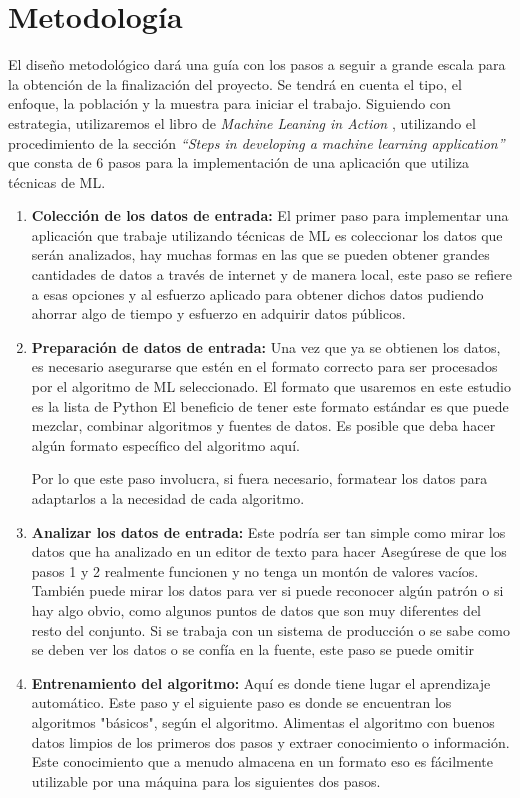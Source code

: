 \section{Metodología}
El diseño metodológico dará una guía con los pasos a seguir a grande escala para la obtención de la finalización del proyecto. Se tendrá en cuenta el tipo, el enfoque, la población y la muestra para iniciar el trabajo. Siguiendo con estrategia, utilizaremos el libro de \emph{Machine Leaning in Action} \cite{Harrington2012}, utilizando el procedimiento de la sección \emph{“Steps in developing a machine learning application”} que consta de 6 pasos para la implementación de una aplicación que utiliza técnicas de ML. 
\begin{enumerate}
	\item \textbf{Colección de los datos de entrada:} El primer paso para implementar una aplicación que trabaje utilizando técnicas de ML es coleccionar los datos que serán analizados, hay muchas formas en las que se pueden obtener grandes cantidades de datos a través de internet y de manera local, este paso se refiere a esas opciones y al esfuerzo aplicado para obtener dichos datos pudiendo ahorrar algo de tiempo y esfuerzo en adquirir datos públicos. 
	\item \textbf{Preparación de datos de entrada:} Una vez que ya se obtienen los datos, es necesario asegurarse que estén en el formato correcto para ser procesados por el algoritmo de ML seleccionado. El formato que usaremos en este estudio es la lista de Python El beneficio de tener este formato estándar es que puede mezclar, combinar algoritmos y fuentes de datos. Es posible que deba hacer algún formato específico del algoritmo aquí.
\par Por lo que este paso involucra, si fuera necesario, formatear los datos para adaptarlos a la necesidad de cada algoritmo.

	\item \textbf{Analizar los datos de entrada:} Este podría ser tan simple como mirar los datos que ha analizado en un editor de texto para hacer Asegúrese de que los pasos 1 y 2 realmente funcionen y no tenga un montón de valores vacíos. También puede mirar los datos para ver si puede reconocer algún patrón o si hay algo obvio, como algunos puntos de datos que son muy diferentes del resto del conjunto. Si se trabaja con un sistema de producción o se sabe como se deben ver los datos o se confía en la fuente, este paso se puede omitir

	\item \textbf{Entrenamiento del algoritmo:} Aquí es donde tiene lugar el aprendizaje automático. Este paso y el siguiente paso es donde se encuentran los algoritmos "básicos", según el algoritmo. Alimentas el algoritmo con buenos datos limpios de los primeros dos pasos y extraer conocimiento o información. Este conocimiento que a menudo almacena en un formato eso es fácilmente utilizable por una máquina para los siguientes dos pasos.


\end{enumerate}
